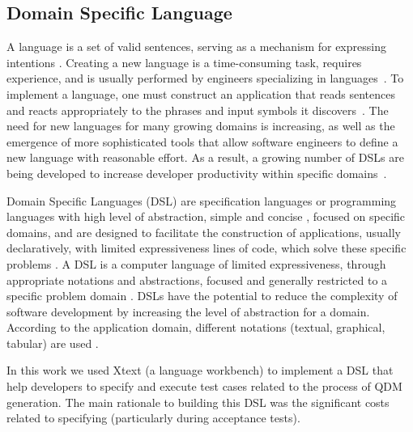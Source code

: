 \subsection{Domain Specific Language}

A language is a set of valid sentences, serving as a mechanism for expressing intentions \cite{parr2010,bentley1987}. 
Creating a new language is a time-consuming task, requires experience, and is usually performed by engineers specializing 
in languages~\cite{karsai2014}. To implement a language, one must construct an application that reads sentences and reacts 
appropriately to the phrases and input symbols it discovers~\cite{parr2013}.
The need for new languages for many growing domains is increasing, as well as the emergence of more sophisticated 
tools that allow software engineers to define a new language with reasonable effort. As a result, a growing number of DSLs 
are being developed to increase developer productivity within specific domains~\cite{karsai2014}. 


Domain Specific Languages (DSL) are specification languages or programming languages with high level of abstraction, 
simple and concise \cite{raja2010}, focused on specific domains, and are designed to facilitate the construction of applications, 
usually declaratively, with limited expressiveness lines of code, which solve these specific problems \cite{neeraj2017}. 
A DSL is a computer language of limited expressiveness, through appropriate notations and abstractions, focused and generally 
restricted to a specific problem domain \cite{fowler2013,vanDeursen2000}. DSLs have the 
potential to reduce the complexity of software development by increasing the level of abstraction for a domain. 
According to the application domain, different notations (textual, graphical, tabular) are used \cite{pfeiffer2008}.


In this work we used Xtext (a language workbench) to implement a DSL that help developers to specify and execute 
test cases related to the process of QDM generation. The main rationale to building this DSL was the significant 
costs related to specifying \callers (particularly during acceptance tests). 

